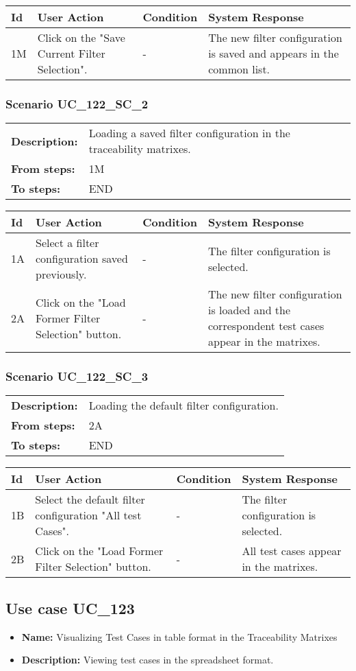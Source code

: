\documentclass[a4paper,11pt]{article}
\newcommand{\bl}{\\ \hline}
\begin{document}
\begin{tabular}{|p{0.8in}|p{1.6in}|p{1.6in}|p{1.6in}|}
\hline
Id & User Action & Condition & System Response  \bl 
1M & Click on the "Save Current Filter Selection". & - & The new filter configuration is saved and appears in the common list. \bl 
\end{tabular}
\subsubsection*{Scenario UC_122_SC_2}
\begin{tabular}{p{1in}p{4in}}
{\bf Description:} & Loading a saved filter configuration in the traceability matrixes. \\
{\bf From steps:} & 1M \\
{\bf To steps:} & END \\
\end{tabular}
 
\begin{tabular}{|p{0.8in}|p{1.6in}|p{1.6in}|p{1.6in}|}
\hline
Id & User Action & Condition & System Response  \bl 
1A & Select a filter configuration saved previously. & - & The filter configuration is selected. \bl 
2A & Click on the "Load Former Filter Selection" button. & - & The new filter configuration is loaded and the correspondent test cases appear in the matrixes. \bl 
\end{tabular}
\subsubsection*{Scenario UC_122_SC_3}
\begin{tabular}{p{1in}p{4in}}
{\bf Description:} & Loading the default filter configuration. \\
{\bf From steps:} & 2A \\
{\bf To steps:} & END \\
\end{tabular}
 
\begin{tabular}{|p{0.8in}|p{1.6in}|p{1.6in}|p{1.6in}|}
\hline
Id & User Action & Condition & System Response  \bl 
1B & Select the default filter configuration "All test Cases". & - & The filter configuration is selected. \bl 
2B & Click on the "Load Former Filter Selection" button. & - & All test cases appear in the matrixes. \bl 
\end{tabular}
\subsection*{Use case UC_123}
\begin{itemize}
\item {\bf Name: }Visualizing Test Cases in table format in the Traceability Matrixes
\item {\bf Description: }Viewing test cases in the spreadsheet format.
\end{itemize}
\end{document}
